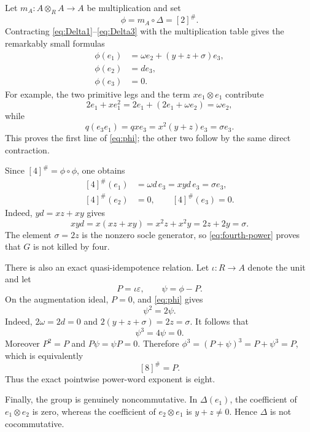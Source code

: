 \documentclass[11pt]{article}
\theoremstyle{remark}
\newcommand{\eps}{\varepsilon}
\begin{document}
Let \(m_A:A\otimes_R A\to A\) be multiplication and set
\[
 \phi=m_A\circ\Delta=[2]^\#.
\]
Contracting \eqref{eq:Delta1}--\eqref{eq:Delta3} with the multiplication
table gives the remarkably small formulas
\begin{equation}\label{eq:phi}
\begin{aligned}
 \phi(e_1)&=\omega e_2+(y+z+\sigma)e_3,\\
 \phi(e_2)&=d e_3,\\
 \phi(e_3)&=0.
\end{aligned}
\end{equation}
For example, the two primitive legs and the term \(x e_1\otimes e_1\)
contribute
\[
 2e_1+x e_1^2=2e_1+(2e_1+\omega e_2)=\omega e_2,
\]
while
\[
 q(e_3e_1)=qx e_3=x^2(y+z)e_3=\sigma e_3.
\]
This proves the first line of \eqref{eq:phi}; the other two follow by the
same direct contraction.

Since \([4]^\#=\phi\circ\phi\), one obtains
\begin{equation}\label{eq:fourth-power}
\begin{aligned}
 [4]^\#(e_1)&=\omega d\,e_3=xyd\,e_3=\sigma e_3,\\
 [4]^\#(e_2)&=0,\qquad [4]^\#(e_3)=0.
\end{aligned}
\end{equation}
Indeed, \(yd=xz+xy\) gives
\begin{equation}\label{eq:socle-carry}
 xyd=x(xz+xy)=x^2z+x^2y=2z+2y=\sigma.
\end{equation}
The element \(\sigma=2z\) is the nonzero socle generator, so
\eqref{eq:fourth-power} proves that \(G\) is not killed by four.

There is also an exact quasi-idempotence relation.  Let
\(\iota:R\to A\) denote the unit and let
\[
 P=\iota\eps,\qquad \psi=\phi-P.
\]
On the augmentation ideal, \(P=0\), and \eqref{eq:phi} gives
\begin{equation}\label{eq:psi-relation-small}
 \psi^2=2\psi.
\end{equation}
Indeed, \(2\omega=2d=0\) and
\(2(y+z+\sigma)=2z=\sigma\).  It follows that
\[
 \psi^3=4\psi=0.
\]
Moreover \(P^2=P\) and \(P\psi=\psi P=0\).  Therefore
\(\phi^3=(P+\psi)^3=P+\psi^3=P\), which is equivalently
\begin{equation}\label{eq:eighth}
 [8]^\#=P.
\end{equation}
Thus the exact pointwise power-word exponent is eight.

Finally, the group is genuinely noncommutative.  In \(\Delta(e_1)\), the
coefficient of \(e_1\otimes e_2\) is zero, whereas the coefficient of
\(e_2\otimes e_1\) is \(y+z\ne0\).  Hence \(\Delta\) is not
cocommutative.
\end{document}
